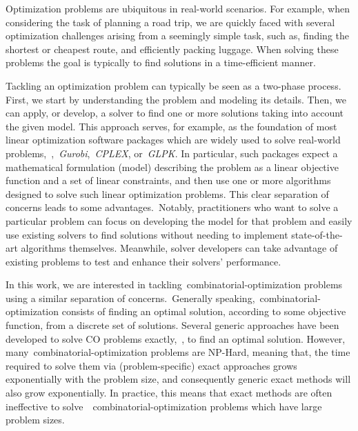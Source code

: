 Optimization problems are ubiquitous in real-world scenarios. For example, when
considering the task of planning a road trip, we are quickly faced with several
optimization challenges arising from a seemingly simple task, such as, finding
the shortest or cheapest route, and efficiently packing luggage. When solving
these problems the goal is typically to find  solutions in a
time-efficient manner.

Tackling an optimization problem can typically be seen as a two-phase process.
First, we start by understanding the problem and modeling its details. Then, we
can apply, or develop, a solver to find one or more solutions taking into
account the given model. This approach serves, for example, as the foundation of
most linear optimization software packages which are widely used to solve
real-world problems,~\eg{},~\textit{Gurobi},~\textit{CPLEX}, or~\textit{GLPK}.
In particular, such packages expect a mathematical formulation (model)
describing the problem as a linear objective function and a set of linear
constraints, and then use one or more algorithms designed to solve such linear
optimization problems. This clear separation of concerns leads to some
advantages.~Notably, practitioners who want to solve a particular problem can
focus on developing the model for that problem and easily use existing solvers
to find solutions without needing to implement state-of-the-art algorithms
themselves. Meanwhile, solver developers can take advantage of existing problems
to test and enhance their solvers' performance.

In this work, we are interested in tackling~\acrfull{combinatorial-optimization}
problems using a similar separation of concerns.~Generally
speaking,~\acrshort{combinatorial-optimization} consists of finding an optimal
solution, according to some objective function, from a discrete set of
solutions. Several generic approaches have been developed to solve CO problems
exactly,~\ie{}, to find an optimal solution. However,
many~\acrshort{combinatorial-optimization} problems are NP-Hard, meaning that,
the time required to solve them via (problem-specific) exact approaches grows
exponentially with the problem size, and consequently generic exact methods will
also grow exponentially. In practice, this means that exact methods are often
ineffective to
solve~~\acrshort{combinatorial-optimization} problems
which have large problem sizes.


